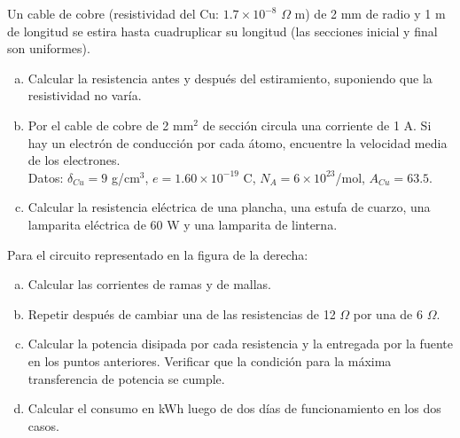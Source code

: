 \documentclass[problemas]{guia}
\begin{document}
 
\maketitle

\begin{problema}{}
    Un cable de cobre (resistividad del Cu: $1.7\times10^{-8}$ $\Omega$ m) de 
    2 mm de radio y 1 m de longitud se estira hasta cuadruplicar su longitud 
    (las secciones inicial y final son uniformes).
    \begin{enumerate}[(a)]
        \item Calcular la resistencia antes y después del estiramiento, 
            suponiendo que la resistividad no varía.
        \item Por el cable de cobre de 2 mm$^2$ de sección circula una 
            corriente de 1 A. Si hay un electrón de conducción por cada átomo,
            encuentre la velocidad media de los electrones. \\
            Datos: $\delta_{Cu} = 9$ g/cm$^3$, $e = 1.60\times10^{-19}$ C, 
            $N_A = 6\times10^{23}$/mol, $A_{Cu} = 63.5$. 
        \item Calcular  la  resistencia  eléctrica  de  una  plancha,  una  
            estufa  de  cuarzo,  una  lamparita eléctrica de 60 W y una 
            lamparita de linterna.
    \end{enumerate}
\end{problema}

\begin{problema}{}
    Para el circuito representado en la figura de la derecha:
    \begin{enumerate}[(a)]
        \item Calcular las corrientes de ramas y de mallas.
        \item Repetir después de cambiar una de las resistencias de 12 
            $\Omega$ por una de 6 $\Omega$.
        \item Calcular la potencia disipada por cada resistencia y la
            entregada por  la  fuente  en  los  puntos  anteriores.  Verificar
            que  la  condición  para  la  máxima transferencia de potencia se
            cumple.
        \item Calcular el consumo en kWh luego de dos días de funcionamiento 
            en los dos casos.
    \end{enumerate}
\end{problema}
\end{document}
